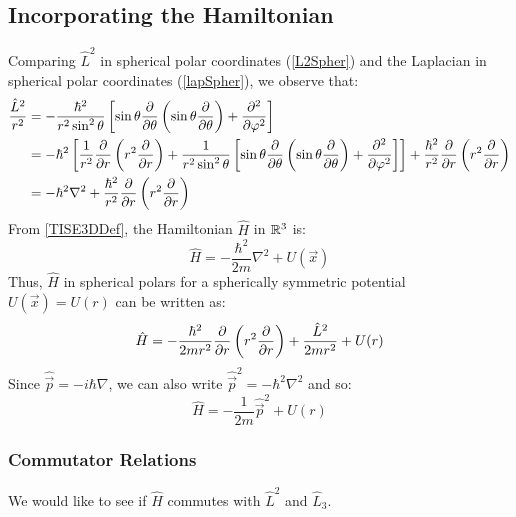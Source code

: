 \documentclass[../main.tex]{subfiles}
\begin{document}
\subsection{Incorporating the Hamiltonian}
Comparing $\hat{L}^2$ in spherical polar coordinates (\cref{L2Spher}) and the Laplacian in spherical polar coordinates (\cref{lapSpher}), we observe that:
\begin{align*}
  \frac{\hat{L}^2}{r^2} &= -\frac{\hbar^2}{r^2 \sin^2 \theta}\left[\sin \theta \pderiv{}{\theta}\left(\sin \theta \pderiv{}{\theta}\right) + \pderiv[2]{}{\varphi}\right] \\
                        &= -\hbar^2 \left[\frac{1}{r^2} \pderiv{}{r}\left(r^2 \pderiv{}{r}\right) + \frac{1}{r^2 \sin^2 \theta}\left[\sin \theta \pderiv{}{\theta}\left(\sin \theta \pderiv{}{\theta}\right) + \pderiv[2]{}{\varphi}\right]\right]  + \frac{\hbar^2}{r^2} \pderiv{}{r}\left(r^2 \pderiv{}{r}\right) \\
                        &= -\hbar^2 \nabla^2 + \frac{\hbar^2}{r^2} \pderiv{}{r}\left(r^2 \pderiv{}{r}\right)
\end{align*}
From \cref{TISE3DDef}, the Hamiltonian $\hat{H}$ in $\mathbb{R}^3$ is:
\[
  \hat{H} = -\frac{\hbar^2}{2m} \nabla^2 + U(\vec{x})
\]
Thus, $\hat{H}$ in spherical polars for a spherically symmetric potential $U(\vec{x}) = U(r)$ can be written as:
\begin{equation}
  \hat{H} = - \frac{\hbar^2}{2mr^2}\pderiv{}{r}\left(r^2 \pderiv{}{r}\right) + \frac{\hat{L}^2}{2mr^2} + U(r) \label{TISESpherL2}
\end{equation}
Since $\hat{\vec{p}} = -i\hbar \nabla$, we can also write $\hat{\vec{p}}^2 = - \hbar^2 \nabla^2$ and so:
\begin{equation}
  \hat{H} = -\frac{1}{2m} \hat{\vec{p}}^2 + U(r) \label{hamilP}
\end{equation}
\subsubsection{Commutator Relations}
We would like to see if $\hat{H}$ commutes with $\hat{L}^2$ and $\hat{L}_3$.
\end{document}
